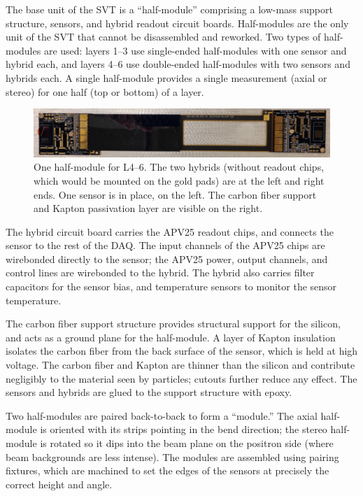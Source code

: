The base unit of the SVT is a ``half-module'' comprising a low-mass support structure, sensors, and hybrid readout circuit boards.
Half-modules are the only unit of the SVT that cannot be disassembled and reworked.
Two types of half-modules are used: layers 1--3 use single-ended half-modules with one sensor and hybrid each, and layers 4--6 use double-ended half-modules with two sensors and hybrids each.
A single half-module provides a single measurement (axial or stereo) for one half (top or bottom) of a layer.

\begin{figure}[htp]
    \includegraphics[width=\textwidth]{detector/figs/l456_hm}
    \caption{One half-module for L4--6. The two hybrids (without readout chips, which would be mounted on the gold pads) are at the left and right ends. One sensor is in place, on the left. The carbon fiber support and Kapton passivation layer are visible on the right.}
    \label{fig:l456_hm}
\end{figure}

The hybrid circuit board carries the APV25 readout chips, and connects the sensor to the rest of the DAQ.
The input channels of the APV25 chips are wirebonded directly to the sensor; the APV25 power, output channels, and control lines are wirebonded to the hybrid.
The hybrid also carries filter capacitors for the sensor bias, and temperature sensors to monitor the sensor temperature.

The carbon fiber support structure provides structural support for the silicon, and acts as a ground plane for the half-module.
A layer of Kapton insulation isolates the carbon fiber from the back surface of the sensor, which is held at high voltage.
The carbon fiber and Kapton are thinner than the silicon and contribute negligibly to the material seen by particles; cutouts further reduce any effect.
The sensors and hybrids are glued to the support structure with epoxy.

Two half-modules are paired back-to-back to form a ``module.''
The axial half-module is oriented with its strips pointing in the bend direction; the stereo half-module is rotated so it dips into the beam plane on the positron side (where beam backgrounds are less intense).
The modules are assembled using pairing fixtures, which are machined to set the edges of the sensors at precisely the correct height and angle.

